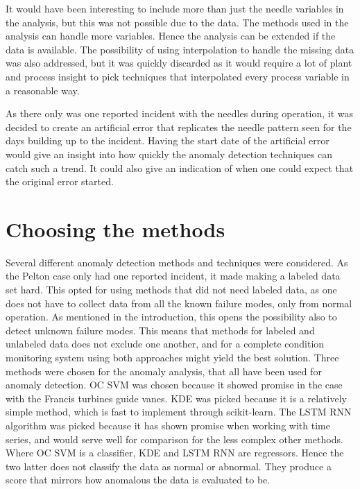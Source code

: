     It would have been interesting to include more than just the needle variables in the analysis, but this was not possible due to the data. The methods used in the analysis can handle more variables. Hence the analysis can be extended if the data is available. The possibility of using interpolation to handle the missing data was also addressed, but it was quickly discarded as it would require a lot of plant and process insight to pick techniques that interpolated every  process variable in a reasonable way.     
     
     As there only was one reported incident with the needles during operation, it was decided to create an artificial error that replicates the needle pattern seen for the days building up to the incident. Having the start date of the artificial error would give an insight into how quickly the anomaly detection techniques can catch such a trend. It could also give an indication of when one could expect that the original error started.  
    
    
  

\section{Choosing the methods}
    Several different anomaly detection methods and techniques were considered. As the Pelton case only had one reported incident, it made making a labeled data set hard. This opted for using methods that did not need labeled data, as one does not have to collect data from all the known failure modes, only from normal operation. As mentioned in the introduction, this opens the possibility also to detect unknown failure modes. This means that methods for labeled and unlabeled data does not exclude one another, and for a complete condition monitoring system using both approaches might yield the best solution. Three methods were chosen for the anomaly analysis, that all have been used for anomaly detection. OC SVM was chosen because it showed promise in the case with the Francis turbines guide vanes. KDE was picked because it is a relatively simple method, which is fast to implement through scikit-learn. The LSTM RNN algorithm was picked because it has shown promise when working with time series, and would serve well for comparison for the less complex other methods. Where OC SVM is a classifier, KDE and LSTM RNN are regressors. Hence the two latter does not classify the data as normal or abnormal. They produce a score that mirrors how anomalous the data is evaluated to be.
    
